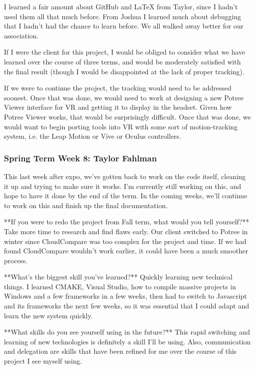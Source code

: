 \documentclass[draftclsnofoot,onecolumn]{IEEEtran}
\begin{document}
I learned a fair amount about GitHub and LaTeX from Taylor, since I hadn't used them all that much before. From Joshua I learned much about debugging that I hadn't had the chance to learn before. We all walked away better for our association.

If I were the client for this project, I would be obliged to consider what we have learned over the course of three terms, and would be moderately satisfied with the final result (though I would be disappointed at the lack of proper tracking).

If we were to continue the project, the tracking would need to be addressed soonest. Once that was done, we would need to work at designing a new Potree Viewer interface for VR and getting it to display in the headset. Given how Potree Viewer works, that would be surprisingly difficult. Once that was done, we would want to begin porting tools into VR with some sort of motion-tracking system, i.e. the Leap Motion or Vive or Oculus controllers.

\subsubsection{Spring Term Week 8: Taylor Fahlman}

This last week after expo, we've gotten back to work on the code itself, cleaning it up and trying to make sure it works. I'm currently still working on this, and hope to have it done by the end of the term. In the coming weeks, we'll continue to work on this and finish up the final documentation.


**If you were to redo the project from Fall term, what would you tell yourself?**
Take more time to research and find flaws early. Our client switched to Potree in winter since CloudCompare was too complex for the project and time. If we had found CloudCompare wouldn't work earlier, it could have been a much smoother process. 

**What's the biggest skill you've learned?**
Quickly learning new technical things. I learned CMAKE, Visual Studio, how to compile massive projects in Windows and a few frameworks in a few weeks, then had to switch to Javascript and its frameworks the next few weeks, so it was essential that I could adapt and learn the new system quickly. 

**What skills do you see yourself using in the future?**
This rapid switching and learning of new technologies is definitely a skill I'll be using. Also, communication and delegation are skills that have been refined for me over the course of this project I see myself using.
\end{document}
